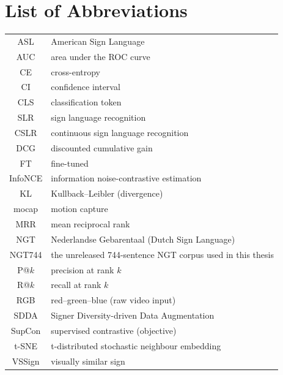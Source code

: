 \chapter{List of Abbreviations}
        \begin{table}[h]
                \centering
                \begin{tabular}{cl}
                                ASL & American Sign Language \\
                                AUC & area under the ROC curve \\
                                CE & cross-entropy \\
                                CI & confidence interval \\
                                CLS & classification token \\
                                SLR & sign language recognition \\
                                CSLR & continuous sign language recognition \\
                                DCG & discounted cumulative gain \\
                                FT & fine-tuned \\
                                InfoNCE & information noise-contrastive estimation \\
                                KL & Kullback--Leibler (divergence) \\
                                mocap & motion capture \\
                                MRR & mean reciprocal rank \\
                                NGT & Nederlandse Gebarentaal (Dutch Sign Language) \\
                                NGT744 & the unreleased 744-sentence NGT corpus used in this thesis \\
                                P@$k$ & precision at rank $k$ \\
                                R@$k$ & recall at rank $k$ \\
                                RGB & red--green--blue (raw video input) \\
                                SDDA & Signer Diversity-driven Data Augmentation \\
                                SupCon & supervised contrastive (objective) \\
                                t-SNE & t-distributed stochastic neighbour embedding \\
                                VSSign & visually similar sign \\
                \end{tabular}
        \end{table}
